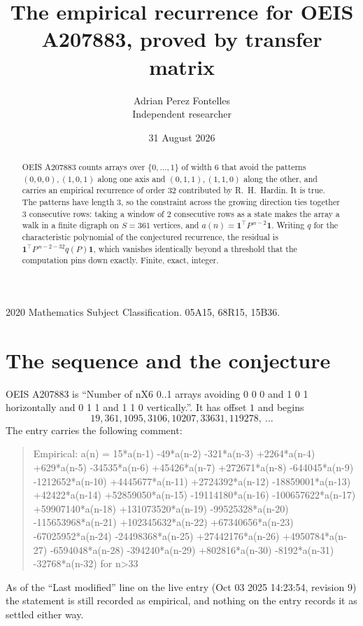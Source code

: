 \documentclass[11pt,a4paper]{article}
\title{The empirical recurrence for OEIS A207883, proved by transfer matrix}
\author{Adrian Perez Fontelles\\ \small Independent researcher}
\date{31 August 2026}
\theoremstyle{plain}
\theoremstyle{definition}
\begin{document}
\maketitle

\begin{abstract}
OEIS A207883 counts arrays over $\{0,\dots,1\}$ of width $6$ that avoid the patterns
$(0,0,0), (1,0,1)$ along one axis and $(0,1,1), (1,1,0)$ along the other, and carries an empirical recurrence of
order $32$ contributed by R.~H.~Hardin. It is true. The patterns have length $3$, so
the constraint across the growing direction ties together $3$ consecutive rows: taking a
window of $2$ consecutive rows as a state makes the array a walk in a finite digraph
on $S=361$ vertices, and $a(n)=\mathbf{1}^{\!\top}P^{\,n-2}\mathbf{1}$. Writing $q$
for the characteristic polynomial of the conjectured recurrence, the residual is
$\mathbf{1}^{\!\top}P^{\,n-2-32}q(P)\mathbf{1}$, which vanishes identically
beyond a threshold that the computation pins down exactly. Finite, exact, integer.
\end{abstract}

\noindent\small 2020 Mathematics Subject Classification. 05A15, 68R15, 15B36.\normalsize

\section{The sequence and the conjecture}

OEIS A207883 is ``Number of nX6 0..1 arrays avoiding 0 0 0 and 1 0 1 horizontally and 0 1 1 and 1 1 0 vertically.''. It has offset
$1$ and begins
\[
19, 361, 1095, 3106, 10207, 33631, 119278,\ \dots
\]
The entry carries the following comment:
\begin{quote}\small
Empirical: a(n) = 15*a(n-1) -49*a(n-2) -321*a(n-3) +2264*a(n-4) +629*a(n-5) -34535*a(n-6) +45426*a(n-7) +272671*a(n-8) -644045*a(n-9) -1212652*a(n-10) +4445677*a(n-11) +2724392*a(n-12) -18859001*a(n-13) +42422*a(n-14) +52859050*a(n-15) -19114180*a(n-16) -100657622*a(n-17) +59907140*a(n-18) +131073520*a(n-19) -99525328*a(n-20) -115653968*a(n-21) +102345632*a(n-22) +67340656*a(n-23) -67025952*a(n-24) -24498368*a(n-25) +27442176*a(n-26) +4950784*a(n-27) -6594048*a(n-28) -394240*a(n-29) +802816*a(n-30) -8192*a(n-31) -32768*a(n-32) for n>33
\end{quote}
As of the ``Last modified'' line on the live entry (Oct 03 2025 14:23:54, revision
9) the statement is still recorded as empirical, and nothing on the entry
records it as settled either way.
\end{document}
